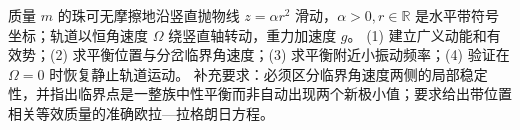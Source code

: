 质量 \(m\) 的珠可无摩擦地沿竖直抛物线 \(z=\alpha r^2\) 滑动，\(\alpha>0,r\in\mathbb R\) 是水平带符号坐标；轨道以恒角速度 \(\Omega\) 绕竖直轴转动，重力加速度 \(g\)。
(1) 建立广义动能和有效势；(2) 求平衡位置与分岔临界角速度；(3) 求平衡附近小振动频率；(4) 验证在 \(\Omega=0\) 时恢复静止轨道运动。
补充要求：必须区分临界角速度两侧的局部稳定性，并指出临界点是一整族中性平衡而非自动出现两个新极小值；要求给出带位置相关等效质量的准确欧拉—拉格朗日方程。
